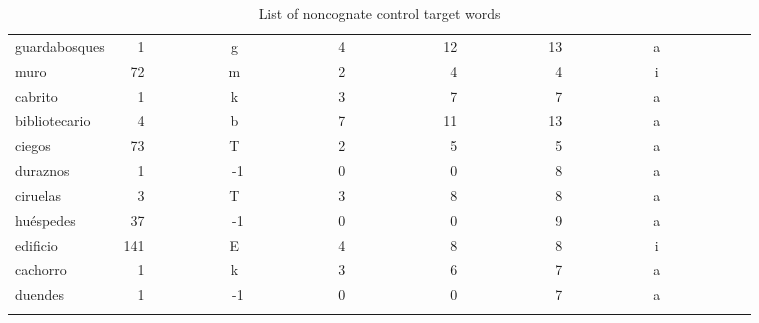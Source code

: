 \begin{longtable}{|l|c|c|c|c|c|c|}
guardabosques&~~1~~~~~~~~~~&g~~~~~~~~~~~~&4~~~~~~~~~~~~&12~~~~~~~~~~~&13~~~~~~~~~~~&a~~~~~~~~~~~~\\ 
muro~~~~~~~~~&~72~~~~~~~~~~&m~~~~~~~~~~~~&2~~~~~~~~~~~~&~4~~~~~~~~~~~&~4~~~~~~~~~~~&i~~~~~~~~~~~~\\ 
cabrito~~~~~~&~~1~~~~~~~~~~&k~~~~~~~~~~~~&3~~~~~~~~~~~~&~7~~~~~~~~~~~&~7~~~~~~~~~~~&a~~~~~~~~~~~~\\ 
bibliotecario&~~4~~~~~~~~~~&b~~~~~~~~~~~~&7~~~~~~~~~~~~&11~~~~~~~~~~~&13~~~~~~~~~~~&a~~~~~~~~~~~~\\ 
ciegos~~~~~~~&~73~~~~~~~~~~&T~~~~~~~~~~~~&2~~~~~~~~~~~~&~5~~~~~~~~~~~&~5~~~~~~~~~~~&a~~~~~~~~~~~~\\ 
duraznos~~~~~&~~1~~~~~~~~~~&-1~~~~~~~~~~~&0~~~~~~~~~~~~&~0~~~~~~~~~~~&~8~~~~~~~~~~~&a~~~~~~~~~~~~\\ 
ciruelas~~~~~&~~3~~~~~~~~~~&T~~~~~~~~~~~~&3~~~~~~~~~~~~&~8~~~~~~~~~~~&~8~~~~~~~~~~~&a~~~~~~~~~~~~\\ 
hu\'{e}spedes~~~~&~37~~~~~~~~~~&-1~~~~~~~~~~~&0~~~~~~~~~~~~&~0~~~~~~~~~~~&~9~~~~~~~~~~~&a~~~~~~~~~~~~\\ 
edificio~~~~~&141~~~~~~~~~~&E~~~~~~~~~~~~&4~~~~~~~~~~~~&~8~~~~~~~~~~~&~8~~~~~~~~~~~&i~~~~~~~~~~~~\\ 
cachorro~~~~~&~~1~~~~~~~~~~&k~~~~~~~~~~~~&3~~~~~~~~~~~~&~6~~~~~~~~~~~&~7~~~~~~~~~~~&a~~~~~~~~~~~~\\ 
duendes~~~~~~&~~1~~~~~~~~~~&-1~~~~~~~~~~~&0~~~~~~~~~~~~&~0~~~~~~~~~~~&~7~~~~~~~~~~~&a~~~~~~~~~~~~\\ 
\hline
\caption{List of noncognate control target words}\label{span_controls}
\end{longtable}
